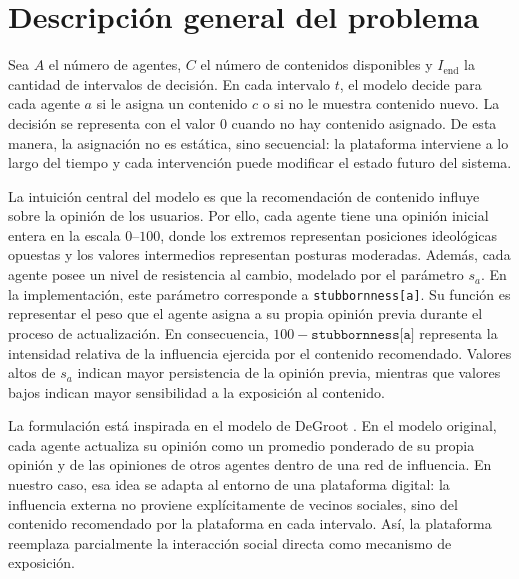 \documentclass[10pt,letterpaper]{article}
\begin{document}
\section{Descripci\'on general del problema}

Sea \(A\) el n\'umero de agentes, \(C\) el n\'umero de contenidos disponibles y \(I_{\text{end}}\) la cantidad de intervalos de decisi\'on. En cada intervalo \(t\), el modelo decide para cada agente \(a\) si le asigna un contenido \(c\) o si no le muestra contenido nuevo. La decisi\'on se representa con el valor \(0\) cuando no hay contenido asignado. De esta manera, la asignaci\'on no es est\'atica, sino secuencial: la plataforma interviene a lo largo del tiempo y cada intervenci\'on puede modificar el estado futuro del sistema.

La intuici\'on central del modelo es que la recomendaci\'on de contenido influye sobre la opini\'on de los usuarios. Por ello, cada agente tiene una opini\'on inicial entera en la escala \(0\)--\(100\), donde los extremos representan posiciones ideol\'ogicas opuestas y los valores intermedios representan posturas moderadas. Adem\'as, cada agente posee un nivel de resistencia al cambio, modelado por el par\'ametro \(s_a\). En la implementaci\'on, este par\'ametro corresponde a \texttt{stubbornness[a]}. Su funci\'on es representar el peso que el agente asigna a su propia opini\'on previa durante el proceso de actualizaci\'on. En consecuencia, \(100-\texttt{stubbornness[a]}\) representa la intensidad relativa de la influencia ejercida por el contenido recomendado. Valores altos de \(s_a\) indican mayor persistencia de la opini\'on previa, mientras que valores bajos indican mayor sensibilidad a la exposici\'on al contenido.

La formulaci\'on est\'a inspirada en el modelo de DeGroot \cite{degroot1974}. En el modelo original, cada agente actualiza su opini\'on como un promedio ponderado de su propia opini\'on y de las opiniones de otros agentes dentro de una red de influencia. En nuestro caso, esa idea se adapta al entorno de una plataforma digital: la influencia externa no proviene expl\'icitamente de vecinos sociales, sino del contenido recomendado por la plataforma en cada intervalo. As\'i, la plataforma reemplaza parcialmente la interacci\'on social directa como mecanismo de exposici\'on.
\end{document}

